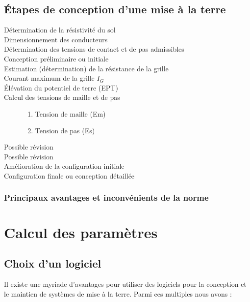 		\subsection{Étapes de conception d'une mise à la terre}
			\begin{description}
			\item[Détermination de la résistivité du sol]
			\item[Dimensionnement des conducteurs]
			\item[Détermination des tensions de contact et de pas admissibles]
			\item[Conception préliminaire ou initiale]
			\item[Estimation (détermination) de la résistance de la grille]
			\item[Courant maximum de la grille $I_{G}$]
			\item[Élévation du potentiel de terre (EPT)]
			\item[Calcul des tensions de maille et de pas]
				\begin{enumerate}
				\item Tension de maille (Em)
				\item Tension de pas (Es)
				\end{enumerate}
			\item[Possible révision]
			\item[Possible révision]
			\item[Amélioration de la configuration initiale]
			\item[Configuration finale ou conception détaillée]
			\end{description}
		\subsubsection{Principaux avantages et inconvénients de la norme}
	\section{Calcul des paramètres}

		\subsection{Choix d'un logiciel}
Il existe une myriade d'avantages pour utiliser des logiciels pour la conception et le maintien de systèmes de mise à la terre. Parmi ces multiples nous avons :\\

